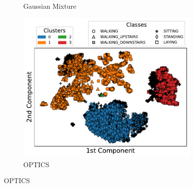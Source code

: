 \documentclass[10pt, a4paper, twocolumn]{article}
\begin{document}
\begin{figure}[t]
\begin{subfigure}[t]{0.196\textwidth}
        \caption{Gaussian Mixture}
        \label{fig:gaussmix_scatter}
    \end{subfigure}
    \begin{subfigure}[t]{0.196\textwidth}
        \includegraphics[width=\linewidth]{immagini simone/optics_scatter.pdf}
        \caption{OPTICS}
        \label{fig:optics_scatter}
    \end{subfigure}


\end{figure}
\end{document}
